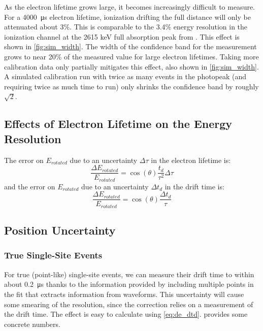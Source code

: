\documentclass[herrin-thesis.tex]{subfiles}
\begin{document}
As the electron lifetime grows large, it becomes increasingly difficult to measure. For a  \SI{4000}{\micro\second}  electron lifetime, ionization drifting the full distance will only be attenuated about 3\%. This is comparable to the 3.4\% energy resolution in the ionization channel at the 2615 keV full absorption peak from . This effect is shown in \cref{fig:sim_width}. The width of the confidence band for the measurement grows to near 20\% of the measured value for large electron lifetimes. Taking more calibration data only partially mitigates this effect, also shown in \cref{fig:sim_width}. A simulated calibration run with twice as many events in the photopeak (and requiring twice as much time to run) only shrinks the confidence band by roughly \(\sqrt{2}\).

\subsection{Effects of Electron Lifetime on the Energy Resolution}

The error on \(E_{rotated}\) due to an uncertainty \(\Delta\tau\) in the electron lifetime is:
\begin{equation}
\frac{\Delta E_{rotated}}{E_{rotated}} = \cos(\theta) \frac{t_d}{\tau^2}\Delta\tau
\label{eq:de_dtau}
\end{equation}
and the error on \(E_{rotated}\) due to an uncertainty \(\Delta t_d\) in the drift time is:
\begin{equation}
\frac{\Delta E_{rotated}}{E_{rotated}} = \cos(\theta) \frac{\Delta t_d}{\tau}
\label{eq:de_dtd}
\end{equation}


\subsection{Position Uncertainty}
\subsubsection{True Single-Site Events}
For true (point-like) single-site events, we can measure their drift time to within about \SI{0.2}{\micro\second} thanks to the information provided by including multiple points in the fit that extracts information from waveforms. This uncertainty will cause some smearing of the resolution, since the correction relies on a measurement of the drift time. The effect is easy to calculate using \cref{eq:de_dtd}.  provides some concrete numbers.
\end{document}
